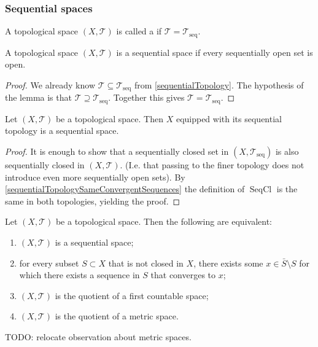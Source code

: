 \subsubsection{Sequential spaces}
\begin{definition}
A topological space $(X,\mathcal{T})$ is called a  if $\mathcal{T} = \mathcal{T}_\text{seq}$.
\end{definition}

\begin{lemma}
A topological space $(X,\mathcal{T})$ is a sequential space if every sequentially open set is open.
\end{lemma}
\begin{proof}
We already know $\mathcal{T} \subseteq \mathcal{T}_\text{seq}$ from \ref{sequentialTopology}. The hypothesis of the lemma is that $\mathcal{T} \supseteq \mathcal{T}_\text{seq}$. Together this gives $\mathcal{T} = \mathcal{T}_\text{seq}$.
\end{proof}

\begin{lemma}
Let $(X,\mathcal{T})$ be a topological space. Then $X$ equipped with its sequential topology is a sequential space.
\end{lemma}
\begin{proof}
It is enough to show that a sequentially closed set in $(X,\mathcal{T}_\text{seq})$ is also sequentially closed in $(X,\mathcal{T})$. (I.e. that passing to the finer topology does not introduce even more sequentially open sets). By \ref{sequentialTopologySameConvergentSequences} the definition of $\operatorname{SeqCl}$ is the same in both topologies, yielding the proof.
\end{proof}

\begin{proposition}
Let $(X,\mathcal{T})$ be a topological space. Then the following are equivalent:
\begin{enumerate}
\item $(X,\mathcal{T})$ is a sequential space;
\item for every subset $S\subset X$ that is not closed in $X$, there exists some $x\in \bar{S}\setminus S$ for which there exists a sequence in $S$ that converges to $x$;
\item $(X,\mathcal{T})$ is the quotient of a first countable space;
\item $(X,\mathcal{T})$ is the quotient of a metric space.
\end{enumerate}
\end{proposition}
TODO: relocate observation about metric spaces.

